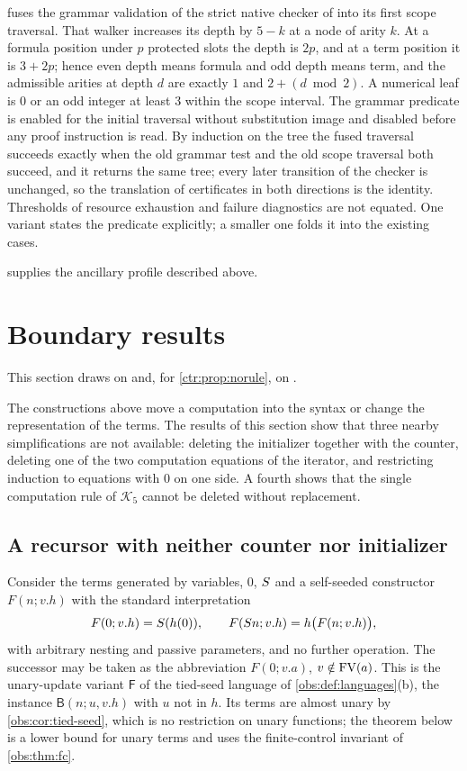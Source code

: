  fuses the grammar validation of the strict native checker of
 into its first scope traversal. That walker increases its
depth by $5-k$ at a node of arity $k$. At a formula position under $p$ protected slots the
depth is $2p$, and at a term position it is $3+2p$; hence even depth means formula and odd
depth means term, and the admissible arities at depth $d$ are exactly $1$ and
$2+(d\bmod 2)$. A numerical leaf is $0$ or an odd integer at least $3$ within the scope
interval. The grammar predicate is enabled for the initial traversal without substitution
image and disabled before any proof instruction is read. By induction on the tree the fused
traversal succeeds exactly when the old grammar test and the old scope traversal both
succeed, and it returns the same tree; every later transition of the checker is unchanged,
so the translation of certificates in both directions is the identity. Thresholds of
resource exhaustion and failure diagnostics are not equated. One variant states the
predicate explicitly; a smaller one folds it into the existing cases.

 supplies the ancillary profile described above.

\section{Boundary results}\label{ctr:sec:bounds}

This section draws on  and, for \cref{ctr:prop:norule}, on
.

The constructions above move a computation into the syntax or change the representation of
the terms. The results of this section show that three nearby simplifications are not
available: deleting the initializer together with the counter, deleting one of the two
computation equations of the iterator, and restricting induction to equations with $0$ on
one side. A fourth shows that the single computation rule of $\mathcal K_5$ cannot be
deleted without replacement.

\subsection{A recursor with neither counter nor initializer}

Consider the terms generated by variables, $0$, $S$ and a self-seeded constructor
$F(n;v.h)$ with the standard interpretation
\[
 F(0;v.h)=S(h(0)),\qquad F(S n;v.h)=h\bigl(F(n;v.h)\bigr),
\]
with arbitrary nesting and passive parameters, and no further operation. The successor may
be taken as the abbreviation $F(0;v.a)$, $v\notin\operatorname{FV}(a)$. This is the unary-update variant
$\mathsf F$ of the tied-seed language of \cref{obs:def:languages}(b), the instance
$\mathsf B(n;u,v.h)$ with $u$ not in $h$. Its terms are almost unary by
\cref{obs:cor:tied-seed}, which is no restriction on unary functions; the theorem below is a
lower bound for unary terms and uses the finite-control invariant of \cref{obs:thm:fc}.

